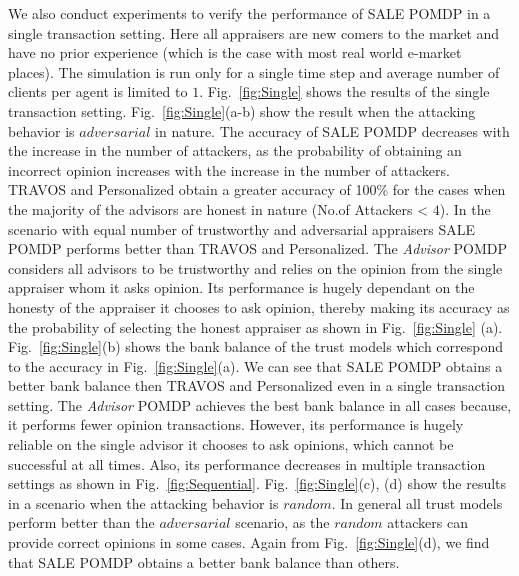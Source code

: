 \documentclass{aamas2014}
\providecommand{\SALEP}{SALE POMDP}
\begin{document}
We also conduct experiments to verify the performance of \SALEP{} in a single transaction setting.  Here all appraisers are new comers to the market and have no prior experience (which is the case with most real world e-market places). The simulation is run only for a single time step and average number of clients per agent is limited to $1$. Fig.~\ref{fig:Single} shows the results of the single transaction setting.  Fig.~\ref{fig:Single}(a-b) show the result when the attacking behavior is $adversarial$ in nature.  The accuracy of \SALEP{} decreases with the increase in the number of attackers, as the probability of obtaining an incorrect opinion increases with the increase in the number of attackers. TRAVOS and Personalized obtain a greater accuracy of 100\% for the cases when the majority of the advisors are honest in nature (No.of Attackers < $4$).  In the scenario with equal number of trustworthy and adversarial appraisers \SALEP{} performs better than TRAVOS and Personalized. The \textit{Advisor} POMDP considers all advisors to be trustworthy and relies on the opinion from the single appraiser whom it asks opinion. Its performance is hugely dependant on the honesty of the appraiser it chooses to ask opinion, thereby making its accuracy as the probability of selecting the honest appraiser as shown in Fig.~\ref{fig:Single} (a).  Fig.~\ref{fig:Single}(b) shows the bank balance of the trust models which correspond to the accuracy in Fig.~\ref{fig:Single}(a). We can see that \SALEP{} obtains a better bank balance then TRAVOS and Personalized even in a single transaction setting. The \textit{Advisor} POMDP achieves the best bank balance in all cases because, it performs fewer opinion transactions. However, its performance is hugely reliable on the single advisor it chooses to ask opinions, which cannot be successful at all times. Also,  its performance decreases in multiple transaction settings as shown in Fig.~\ref{fig:Sequential}.
  Fig.~\ref{fig:Single}(c), (d) show the results in a scenario when the attacking behavior is $random$. In general all trust models perform better than the $adversarial$ scenario, as the $random$ attackers can provide correct opinions in some cases.  Again from Fig.~\ref{fig:Single}(d), we find that \SALEP{} obtains a better bank balance than others.
\end{document}
